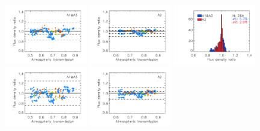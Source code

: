 \begin{figure}[ht!]
  \begin{center}
    \includegraphics[clip=true, trim={0.9cm, 0.2cm, 0, 0.6cm}, width=0.32\textwidth]{Figures/Calibration/plot_flux_density_ratio_obstau_allbright_corrected_skydip_narrow_1mm.pdf}
    \includegraphics[clip=true, trim={0.9cm, 0.2cm, 0, 0.6cm}, width=0.32\textwidth]{Figures/Calibration/plot_flux_density_ratio_obstau_allbright_corrected_skydip_narrow_a2.pdf}
    \includegraphics[clip=true, trim={0.9cm, 0.2cm, 0, 0.6cm}, width=0.32\textwidth]{Figures/Calibration/plot_histo_flux_density_ratio_obstau_allbright_corrected_skydip_narrow_1n2mm.pdf}
    \includegraphics[clip=true, trim={0.9cm, 0.2cm, 0, 0.6cm}, width=0.32\textwidth]{Figures/Calibration/plot_flux_density_ratio_obstau_allbright_tau225_narrow_1mm.pdf}
    \includegraphics[clip=true, trim={0.9cm, 0.2cm, 0, 0.6cm}, width=0.32\textwidth]{Figures/Calibration/plot_flux_density_ratio_obstau_allbright_tau225_narrow_a2.pdf}

\end{center}
\end{figure}
